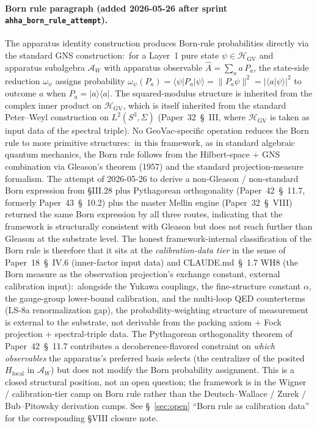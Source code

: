 \documentclass[11pt]{article}
\begin{document}
\paragraph{Born rule paragraph (added 2026-05-26 after sprint
\texttt{ahha\_born\_rule\_attempt}).} The apparatus identity
construction produces Born-rule probabilities directly via the
standard GNS construction:\ for a Layer~1 pure state $\psi \in
\mathcal{H}_{\mathrm{GV}}$ and apparatus subalgebra $\mathcal{A}_W$
with apparatus observable $\hat{A} = \sum_a a \, P_a$, the
state-side reduction $\omega_\psi$ assigns probability
$\omega_\psi(P_a) = \langle\psi|P_a|\psi\rangle = \|P_a \psi\|^2 =
|\langle a|\psi\rangle|^2$ to outcome $a$ when $P_a = |a\rangle\langle
a|$.  The squared-modulus structure is inherited from the complex
inner product on $\mathcal{H}_{\mathrm{GV}}$, which is itself
inherited from the standard Peter--Weyl construction on
$L^2(S^3, \Sigma)$ (Paper~32~\S~III, where $\mathcal{H}_{\mathrm{GV}}$
is taken as input data of the spectral triple).  No GeoVac-specific
operation reduces the Born rule to more primitive structures:\ in
this framework, as in standard algebraic quantum mechanics, the Born
rule follows from the Hilbert-space + GNS combination via Gleason's
theorem (1957) and the standard projection-measure formalism.  The
attempt of 2026-05-26 to derive a non-Gleason / non-standard Born
expression from §III.28 plus Pythagorean orthogonality
(Paper~42~\S~11.7, formerly Paper~43~\S~10.2) plus the master Mellin engine
(Paper~32~\S~VIII) returned the same Born expression by all three
routes, indicating that the framework is structurally consistent
with Gleason but does not reach further than Gleason at the
substrate level.  The honest framework-internal classification of
the Born rule is therefore that it sits at the
\emph{calibration-data tier} in the sense of Paper~18~\S~IV.6
(inner-factor input data) and CLAUDE.md~\S~1.7 WH8 (the Born measure as
the observation projection's exchange constant, external calibration
input):\ alongside the Yukawa couplings, the fine-structure
constant $\alpha$, the gauge-group lower-bound calibration, and the
multi-loop QED counterterms (LS-8a renormalization gap), the
probability-weighting structure of measurement is external to the
substrate, not derivable from the packing axiom + Fock projection +
spectral-triple data.  The Pythagorean orthogonality theorem of
Paper~42~\S~11.7 contributes a decoherence-flavored constraint on
\emph{which observables} the apparatus's preferred basis selects (the
centralizer of the posited $H_{\mathrm{local}}$ in $\mathcal{A}_W$) but does not
modify the Born probability assignment.  This is a closed structural
position, not an open question; the framework is in the Wigner /
calibration-tier camp on Born rule rather than the Deutsch--Wallace /
Zurek / Bub--Pitowsky derivation camps.  See \S~\ref{sec:open}
``Born rule as calibration data'' for the corresponding §VIII
closure note.
\end{document}
